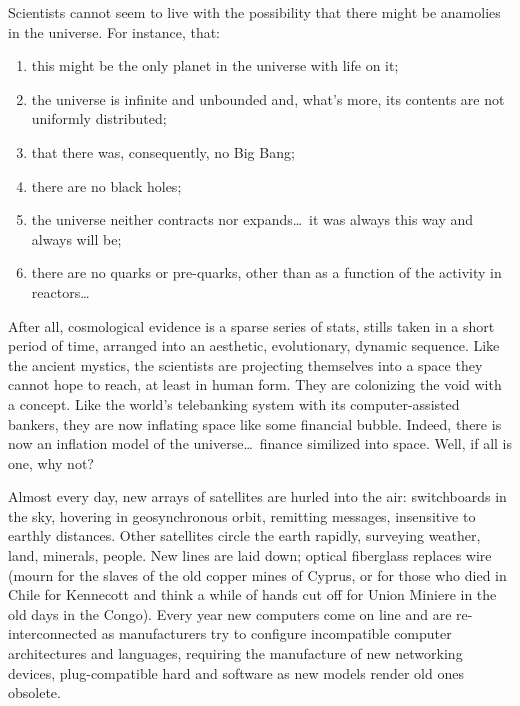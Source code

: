 Scientists cannot seem to live with the possibility that there might be anamolies in the universe.
For instance, that:  
\begin{enumerate}
\item this might be the only planet in the universe with life on it; 
\item the universe is infinite and unbounded and, what's more, its contents are not uniformly distributed;
\item that there was, consequently, no Big Bang; 
\item there are no black holes; 
\item the universe neither contracts nor expands\ldots\ it was always this way and always will be; 
\item there are no quarks or pre-quarks, other than as a function of the activity in reactors\ldots
\end{enumerate}
After all, cosmological evidence is a sparse series of stats, stills taken in a short period of
time, arranged into an aesthetic, evolutionary, dynamic sequence. Like the ancient mystics, the
scientists are projecting themselves into a space they cannot hope to reach, at least in human form.
They are colonizing the void with a concept. Like the world's telebanking system with its
computer-assisted bankers, they are now inflating space like some financial bubble. Indeed, there is
now an inflation model of the universe\ldots\ finance similized into space. Well, if all is one, why
not? 

Almost every day, new arrays of satellites are hurled into the air: switchboards in the sky,
hovering in geosynchronous orbit, remitting messages, insensitive to earthly distances. Other
satellites circle the earth rapidly, surveying weather, land, minerals, people. New lines are laid
down; optical fiberglass replaces wire (mourn for the slaves of the old copper mines of Cyprus, or
for those who died in Chile for Kennecott and think a while of hands cut off for Union Miniere in
the old days in the Congo). Every year new computers come on line and are re-interconnected as
manufacturers try to configure incompatible computer architectures and languages, requiring the
manufacture of new networking devices, plug-compatible hard and software as new models render old
ones obsolete. 

